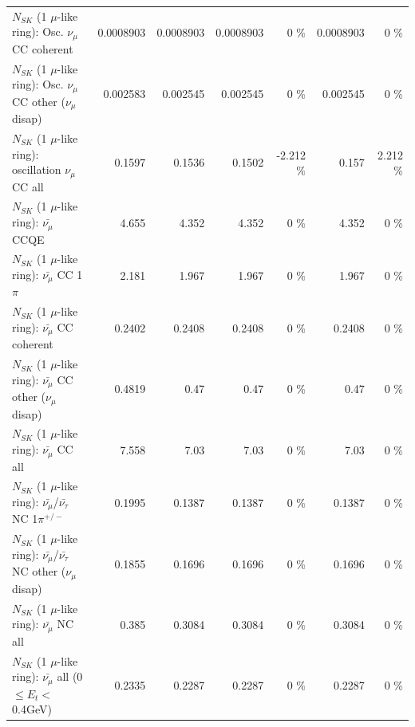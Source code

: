 \begin{table}
\begin{tabular}{| l | r | r | r  r | r  r |}
                        $N_{SK}$ (1 $\mu$-like ring): Osc. $\nu_\mu$ CC coherent &       0.0008903 &       0.0008903 &       0.0008903 &        0 \%  &       0.0008903 &        0 \%  \\ 
         $N_{SK}$ (1 $\mu$-like ring): Osc. $\nu_\mu$ CC other ($\nu_\mu$ disap) &        0.002583 &        0.002545 &        0.002545 &        0 \%  &        0.002545 &        0 \%  \\ 
                      $N_{SK}$ (1 $\mu$-like ring): oscillation $\nu_\mu$ CC all &          0.1597 &          0.1536 &          0.1502 &   -2.212 \%  &           0.157 &    2.212 \%  \\ 
\hline
\hline
                              $N_{SK}$ (1 $\mu$-like ring): $\bar{\nu_\mu}$ CCQE &           4.655 &           4.352 &           4.352 &        0 \%  &           4.352 &        0 \%  \\ 
                         $N_{SK}$ (1 $\mu$-like ring): $\bar{\nu_\mu}$ CC 1$\pi$ &           2.181 &           1.967 &           1.967 &        0 \%  &           1.967 &        0 \%  \\ 
                       $N_{SK}$ (1 $\mu$-like ring): $\bar{\nu_\mu}$ CC coherent &          0.2402 &          0.2408 &          0.2408 &        0 \%  &          0.2408 &        0 \%  \\ 
        $N_{SK}$ (1 $\mu$-like ring): $\bar{\nu_\mu}$ CC other ($\nu_\mu$ disap) &          0.4819 &            0.47 &            0.47 &        0 \%  &            0.47 &        0 \%  \\ 
                          $N_{SK}$ (1 $\mu$-like ring): $\bar{\nu_{\mu}}$ CC all &           7.558 &            7.03 &            7.03 &        0 \%  &            7.03 &        0 \%  \\ 
\hline
  $N_{SK}$ (1 $\mu$-like ring): $\bar{\nu_\mu}$/$\bar{\nu_\tau}$ NC 1$\pi^{+/-}$ &          0.1995 &          0.1387 &          0.1387 &        0 \%  &          0.1387 &        0 \%  \\ 
$N_{SK}$ (1 $\mu$-like ring): $\bar{\nu_\mu}$/$\bar{\nu_\tau}$ NC other ($\nu_\mu$ disap) &          0.1855 &          0.1696 &          0.1696 &        0 \%  &          0.1696 &        0 \%  \\ 
                          $N_{SK}$ (1 $\mu$-like ring): $\bar{\nu_{\mu}}$ NC all &           0.385 &          0.3084 &          0.3084 &        0 \%  &          0.3084 &        0 \%  \\ 
\hline
   $N_{SK}$ (1 $\mu$-like ring): $\bar{\nu_{\mu}}$ all (0 $\leq E_{t} <$ 0.4GeV) &          0.2335 &          0.2287 &          0.2287 &        0 \%  &          0.2287 &        0 \%  \\ 

\end{tabular}
\end{table}
